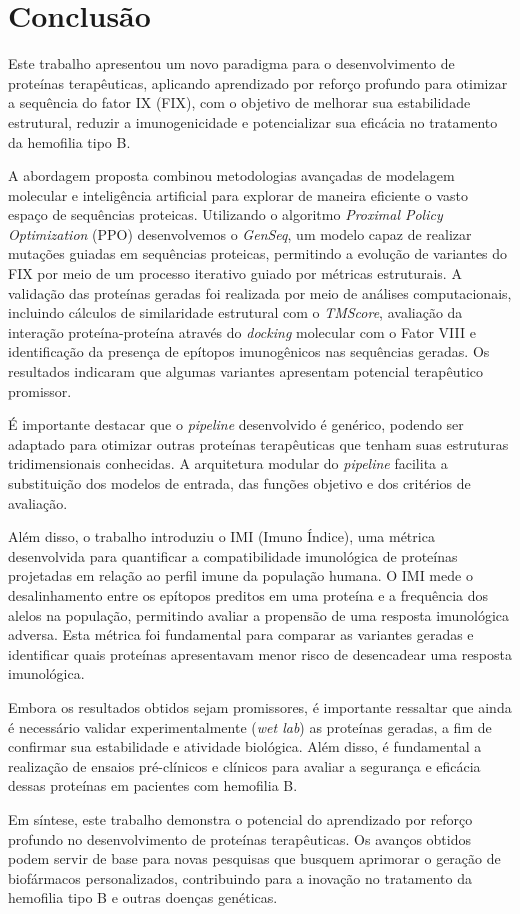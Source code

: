 \chapter{Conclusão}

Este trabalho apresentou um novo paradigma para o desenvolvimento de proteínas terapêuticas,
aplicando aprendizado por reforço profundo para otimizar a sequência do fator IX (FIX),
com o objetivo de melhorar sua estabilidade estrutural, 
reduzir a imunogenicidade e potencializar sua eficácia no tratamento da hemofilia tipo B.  


A abordagem proposta combinou metodologias avançadas de modelagem molecular e inteligência artificial 
para explorar de maneira eficiente o vasto espaço de sequências proteicas. 
Utilizando o algoritmo \textit{Proximal Policy Optimization} (PPO)
desenvolvemos o \textit{GenSeq}, um modelo capaz de realizar mutações guiadas em sequências proteicas,
permitindo a evolução de variantes do FIX por meio de um processo iterativo
guiado por métricas estruturais.
A validação das proteínas geradas foi realizada por meio de análises computacionais, 
incluindo cálculos de similaridade estrutural com o \textit{TMScore}, 
avaliação da interação proteína-proteína através do \textit{docking} molecular com o Fator VIII
e identificação da presença de epítopos imunogênicos nas sequências geradas.
Os resultados indicaram que algumas variantes apresentam potencial terapêutico promissor. 

É importante destacar que o \textit{pipeline} desenvolvido é genérico, 
podendo ser adaptado para otimizar outras proteínas terapêuticas que tenham suas estruturas tridimensionais
conhecidas. A arquitetura modular do \textit{pipeline} facilita a substituição dos modelos de entrada,
das funções objetivo e dos critérios de avaliação.

Além disso, o trabalho introduziu o IMI (Imuno Índice),
uma métrica desenvolvida para quantificar a compatibilidade imunológica de proteínas projetadas 
em relação ao perfil imune da população humana. 
O IMI mede o desalinhamento entre os epítopos 
preditos em uma proteína e a frequência dos alelos na população, 
permitindo avaliar a propensão de uma resposta imunológica adversa.
Esta métrica foi fundamental para comparar as variantes geradas e 
identificar quais proteínas apresentavam menor risco de desencadear uma resposta imunológica.

Embora os resultados obtidos sejam promissores, 
é importante ressaltar que ainda é necessário validar experimentalmente (\textit{wet lab})
as proteínas geradas, a fim de confirmar sua estabilidade e atividade biológica.
Além disso, é fundamental a realização de ensaios pré-clínicos e clínicos
para avaliar a segurança e eficácia dessas proteínas em pacientes com hemofilia B.

Em síntese, este trabalho demonstra o potencial do aprendizado por reforço profundo no desenvolvimento 
de proteínas terapêuticas. 
Os avanços obtidos podem servir de base para novas pesquisas que busquem aprimorar o 
geração de biofármacos personalizados, 
contribuindo para a inovação no tratamento da hemofilia tipo B e outras doenças genéticas.

